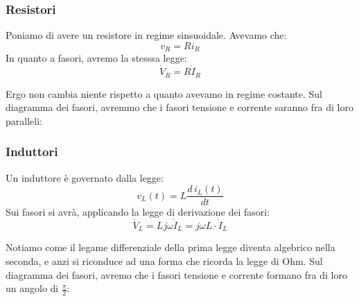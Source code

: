 \documentclass[a4paper,11pt]{article}
\begin{document}
\subsubsection{Resistori}
Poniamo di avere un resistore in regime sinsuoidale.
Avevamo che:
$$
v_R = R i_R
$$
In quanto a fasori, avremo la stesssa legge:
$$
\dot{V}_R = R \dot{I}_R
$$

Ergo non cambia niente rispetto a quanto avevamo in regime costante.
Sul diagramma dei fasori, avremmo che i fasori tensione e corrente saranno fra di loro paralleli:
\begin{center}
\end{center}

\subsubsection{Induttori}
Un induttore è governato dalla legge:
$$
v_L(t) = L \frac{d \, i_L(t)}{dt}
$$
Sui fasori si avrà, applicando la legge di derivazione dei fasori:
$$
\dot{V}_L = L j \omega \dot{I}_L = j \omega L \cdot \dot{I}_L
$$

Notiamo come il legame differenziale della prima legge diventa algebrico nella seconda, e anzi si riconduce ad una forma che ricorda la legge di Ohm.
Sul diagramma dei fasori, avremo che i fasori tensione e corrente formano fra di loro un angolo di $\frac{\pi}{2}$:
\begin{center}
\end{center}
\end{document}

